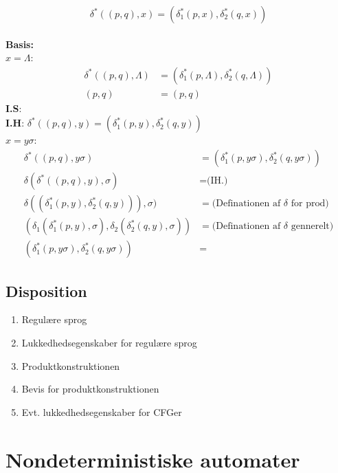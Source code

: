 \documentclass[a4, danish]{article}
\begin{document}
\begin{equation*}
  \delta^*((p,q),x)=  (\delta^*_1(p,x),  \delta_2^*(q,x))
\end{equation*}
\\
\textbf{Basis:}\\
$x=\Lambda$: 
\begin{align*}
  \delta^*((p,q),\Lambda) &= (\delta^*_1(p,\Lambda),  \delta_2^*(q,\Lambda))\\
  (p,q) &= (p,q)
\end{align*}
\textbf{I.S}: \\
\textbf{I.H}: $\delta^*((p,q),y) = (\delta^*_1(p,y),  \delta_2^*(q,y))$ \\
$x=y\sigma$:
\begin{align*}
  \delta^*((p,q),y\sigma) &=  (\delta^*_1(p,y\sigma),  \delta_2^*(q,y\sigma)) \\
  \delta(\delta^*((p,q),y), \sigma) &= \text{(IH.)} \\
  \delta((\delta^*_1(p,y),  \delta_2^*(q,y))), \sigma) &= \text{(Definationen af $\delta$ for prod)} \\
  (\delta_1(\delta^*_1(p,y), \sigma), \delta_2(\delta^*_2(q,y), \sigma)) &= \text{(Definationen af $\delta$ gennerelt)} \\
  (\delta^*_1(p,y\sigma),  \delta_2^*(q,y\sigma)) &=  
\end{align*}

\newpage
\subsection{Disposition}
\begin{enumerate}
  \item Regulære sprog
  \item Lukkedhedsegenskaber for regulære sprog
  \item Produktkonstruktionen
  \item Bevis for produktkonstruktionen 
  \item Evt. lukkedhedsegenskaber for CFGer
\end{enumerate}

\newpage
\section{Nondeterministiske automater}
\end{document}
